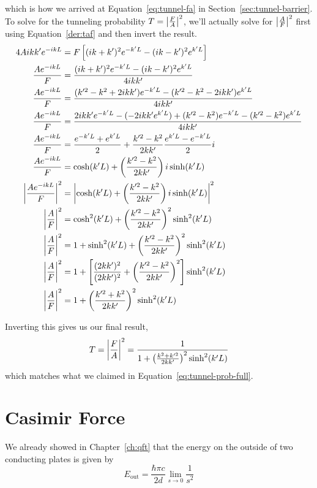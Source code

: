 which is how we arrived at Equation~\ref{eq:tunnel-fa} in Section~\ref{sec:tunnel-barrier}. To solve for the tunneling probability $T = \abs{\frac{F}{A}}^2$, we'll actually solve for $\abs{\frac{A}{F}}^2$ first using Equation~\ref{der:taf} and then invert the result.
\begin{align*}
	4Aikk'e^{-ikL} &= F \left[(ik+k')^2e^{-k'L} - (ik-k')^2e^{k'L}\right] \\
	\frac{Ae^{-ikL}}{F} &= \frac{(ik+k')^2e^{-k'L} - (ik-k')^2e^{k'L}}{4ikk'} \\
	\frac{Ae^{-ikL}}{F} &= \frac{(k^{\prime 2}-k^2 + 2ikk')e^{-k'L} - (k^{\prime 2} - k^2 - 2ikk')e^{k'L}}{4ikk'} \\
	\frac{Ae^{-ikL}}{F} &= \frac{2ikk'e^{-k'L} - (-2ikk'e^{k'L}) + (k^{\prime 2}-k^2)e^{-k'L} - (k^{\prime 2} - k^2)e^{k'L}}{4ikk'} \\
	\frac{Ae^{-ikL}}{F} &= \frac{e^{-k'L} + e^{k'L}}{2} + \frac{k^{\prime 2}-k^2}{2kk'}\frac{e^{k'L} - e^{-k'L}}{2}i \\
	\frac{Ae^{-ikL}}{F} &= \cosh(k'L) + \left(\frac{k^{\prime 2}-k^2}{2kk'}\right)i\sinh(k'L) \\
	\abs{\frac{Ae^{-ikL}}{F}}^2 &= \abs{\cosh(k'L) + \left(\frac{k^{\prime 2}-k^2}{2kk'}\right)i\sinh(k'L)}^2 \\
	\abs{\frac{A}{F}}^2 &= \cosh^2(k'L) + \left(\frac{k^{\prime 2}-k^2}{2kk'}\right)^2\sinh^2(k'L) \\
	\abs{\frac{A}{F}}^2 &= 1 + \sinh^2(k'L) + \left(\frac{k^{\prime 2}-k^2}{2kk'}\right)^2\sinh^2(k'L) \\
	\abs{\frac{A}{F}}^2 &= 1 + \left[ \frac{(2kk')^2}{(2kk')^2} + \left(\frac{k^{\prime 2}-k^2}{2kk'}\right)^2\right]\sinh^2(k'L) \\
	\abs{\frac{A}{F}}^2 &= 1 + \left(\frac{k^{\prime 2}+k^2}{2kk'}\right)^2\sinh^2(k'L) 
\end{align*}

Inverting this gives us our final result,
\begin{equation}
	T = \abs{\frac{F}{A}}^2  = \frac{1}{1 + \left(\frac{k^2+k^{\prime 2}}{2kk'}\right)^2 \sinh^2(k'L)}
\end{equation}
which matches what we claimed in Equation~\ref{eq:tunnel-prob-full}.

\section{Casimir Force} \label{sec:casimir-deriv}
We already showed in Chapter~\ref{ch:qft} that the energy on the outside of two conducting plates is given by
\begin{equation}
	E_{\text{out}} = \frac{\hbar \pi c}{2d} \lim\limits_{s \rightarrow 0} \frac{1}{s^2}  \label{eq:casimir-out-app}
\end{equation}

